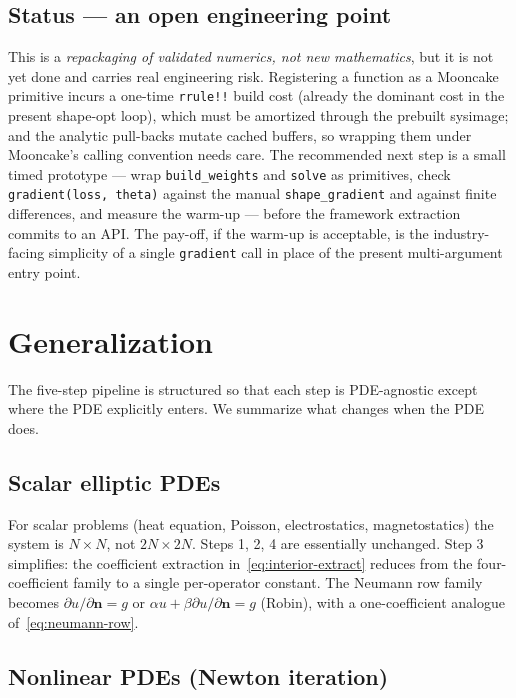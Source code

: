 \documentclass[11pt,a4paper]{article}
\newcommand{\vect}[1]{\boldsymbol{#1}}
\begin{document}
\subsection{Status --- an open engineering point}

This is a \emph{repackaging of validated numerics, not new mathematics}, but it is
not yet done and carries real engineering risk. Registering a function as a Mooncake
primitive incurs a one-time \texttt{rrule!!} build cost (already the dominant cost in
the present shape-opt loop), which must be amortized through the prebuilt sysimage;
and the analytic pull-backs mutate cached buffers, so wrapping them under Mooncake's
calling convention needs care. The recommended next step is a small timed prototype
--- wrap \texttt{build\_weights} and \texttt{solve} as primitives, check
\texttt{gradient(loss, theta)} against the manual \texttt{shape\_gradient} and against
finite differences, and measure the warm-up --- before the framework extraction
commits to an API. The pay-off, if the warm-up is acceptable, is the industry-facing
simplicity of a single \texttt{gradient} call in place of the present
multi-argument entry point.

\section{Generalization}
\label{sec:generalization}

The five-step pipeline is structured so that each step is
PDE-agnostic except where the PDE explicitly enters. We summarize
what changes when the PDE does.

\subsection{Scalar elliptic PDEs}

For scalar problems (heat equation, Poisson, electrostatics,
magnetostatics) the system is $N \times N$, not $2N \times 2N$.
Steps 1, 2, 4 are essentially unchanged. Step 3 simplifies: the
coefficient extraction in~\eqref{eq:interior-extract} reduces from
the four-coefficient family to a single per-operator constant.
The Neumann row family becomes $\partial u/\partial \vect n = g$
or $\alpha u + \beta \partial u/\partial\vect n = g$ (Robin), with
a one-coefficient analogue of~\eqref{eq:neumann-row}.

\subsection{Nonlinear PDEs (Newton iteration)}
\end{document}
